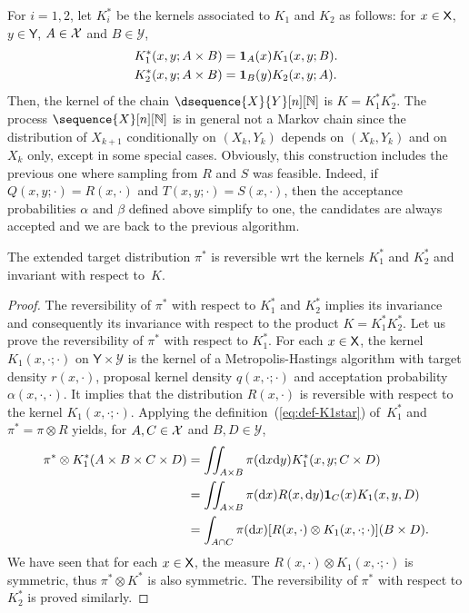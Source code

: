 \documentclass[english,graybox,envcountchap,envcountsame,sectrefs,shortlabels]{svmono}
\theoremstyle{style}
\newcommand{\Yset}{\mathsf{Y}}
\newcommand{\Ysigma}{\mathcal{Y}}
\newcommand{\eqsp}{}
\begin{document}
For $i=1,2$, let $K_i^*$ be the kernels associated to $K_1$ and $K_2$ as follows: for $x\in\mathsf{X}$,
$y\in\Yset$, $A\in\mathcal{X}$ and $B\in\Ysigma$,
\begin{align}
  K_1^*(x,y;A\times B) & = \indi{A}(x) K_1(x,y;B) \eqsp . \label{eq:def-K1star} \\
  K_2^*(x,y;A\times B) & = \indi{B}(y) K_2(x,y;A) \eqsp . \label{eq:def-K2star}
\end{align}
%
Then, the kernel of the chain $\dsequence{X}{Y}[n][\nset]$ is $K=K_1^*K_2^*$.  The process
$\sequence{X}[n][\nset]$ is in general not a Markov chain since the distribution of $X_{k+1}$
conditionally on $(X_k,Y_k)$ depends on $(X_k,Y_k)$ and on $X_k$ only, except in some special cases.
Obviously, this construction includes the previous one where sampling from $R$ and $S$ was
feasible. Indeed, if $Q(x,y;\cdot)=R(x,\cdot)$ and $T(x,y;\cdot)=S(x,\cdot)$, then the acceptance
probabilities $\alpha$ and $\beta$ defined above simplify to one, the candidates are always accepted
and we are back to the previous algorithm.


\begin{framed}
\begin{proposition}
  \label{prop:DA}
  The extended target distribution $\pi^*$ is reversible wrt the kernels $K_1^*$ and $K_2^*$ and
  invariant with respect to~$K$.
\end{proposition}
\end{framed}

\begin{proof}
  The reversibility of $\pi^*$ with respect to $K_1^*$ and $K_2^*$ implies its invariance and
  consequently its invariance with respect to the product $K=K_1^*K_2^*$. Let us prove the
  reversibility of $\pi^*$ with respect to $K_1^*$. For each $x\in\mathsf{X}$, the kernel
  $K_1(x,\cdot;\cdot)$ on $\Yset\times\Ysigma$ is the kernel of a Metropolis-Hastings algorithm with
  target density $r(x,\cdot)$, proposal kernel density $q(x,\cdot;\cdot)$ and acceptation
  probability $\alpha(x,\cdot,\cdot)$. It implies that the
  distribution $R(x,\cdot)$ is reversible with respect to the kernel $K_1(x,\cdot;\cdot)$. Applying
  the definition~(\ref{eq:def-K1star}) of~$K_1^*$ and $\pi^*=\pi\otimes R$ yields, for
  $A,C\in\mathcal{X}$ and $B,D\in\Ysigma$,
  \begin{align*}
    \pi^* \otimes K_1^*(A\times B\times C\times D)
    & = \iint_{A\times B} \pi(\rmd x\rmd y) K_1^*(x,y;C\times D)  \\
    & = \iint_{A\times B} \pi(\rmd x) R(x,\rmd y) \indi{C}(x) K_1(x,y,D) \\
    & = \int_{A\cap C} \pi(\rmd x) [R(x,\cdot) \otimes K_1(x,\cdot;\cdot)] (B\times D) \eqsp .
  \end{align*}
  We have seen that for each $x\in\mathsf{X}$, the measure $R(x,\cdot) \otimes K_1(x,\cdot;\cdot) $ is
  symmetric, thus $\pi^* \otimes K^*$ is also symmetric. The reversibility of $\pi^*$ with respect
  to $K_2^*$ is proved similarly.
\end{proof}
\end{document}
